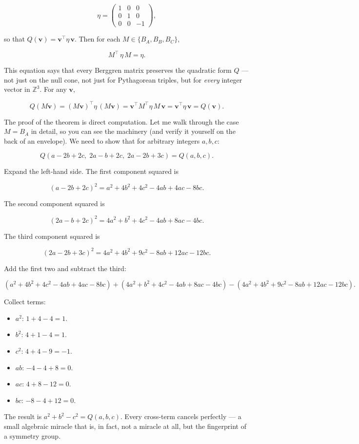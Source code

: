 \[
\eta = \begin{pmatrix} 1 & 0 & 0 \\ 0 & 1 & 0 \\ 0 & 0 & -1 \end{pmatrix},
\]

so that $Q(\mathbf{v}) = \mathbf{v}^\top \eta\, \mathbf{v}$. Then for each $M \in \{B_A, B_B, B_C\}$,

\[
M^{\!\top}\, \eta\, M = \eta.
\]

This equation says that every Berggren matrix preserves the quadratic form $Q$ --- not just on the null cone, not just for Pythagorean triples, but for \textit{every} integer vector in $\mathbb{Z}^3$. For any $\mathbf{v}$,

\[
Q(M\mathbf{v}) = (M\mathbf{v})^\top \eta\, (M\mathbf{v}) = \mathbf{v}^\top M^\top \eta\, M\, \mathbf{v} = \mathbf{v}^\top \eta\, \mathbf{v} = Q(\mathbf{v}).
\]

The proof of the theorem is direct computation. Let me walk through the case $M = B_A$ in detail, so you can see the machinery (and verify it yourself on the back of an envelope). We need to show that for arbitrary integers $a, b, c$:

\[
Q(a - 2b + 2c,\; 2a - b + 2c,\; 2a - 2b + 3c) = Q(a, b, c).
\]

Expand the left-hand side. The first component squared is

\[
(a - 2b + 2c)^2 = a^2 + 4b^2 + 4c^2 - 4ab + 4ac - 8bc.
\]

The second component squared is

\[
(2a - b + 2c)^2 = 4a^2 + b^2 + 4c^2 - 4ab + 8ac - 4bc.
\]

The third component squared is

\[
(2a - 2b + 3c)^2 = 4a^2 + 4b^2 + 9c^2 - 8ab + 12ac - 12bc.
\]

Add the first two and subtract the third:

\[
(a^2 + 4b^2 + 4c^2 - 4ab + 4ac - 8bc) + (4a^2 + b^2 + 4c^2 - 4ab + 8ac - 4bc) - (4a^2 + 4b^2 + 9c^2 - 8ab + 12ac - 12bc).
\]

Collect terms:
\begin{itemize}
\item $a^2$: $1 + 4 - 4 = 1$.
\item $b^2$: $4 + 1 - 4 = 1$.
\item $c^2$: $4 + 4 - 9 = -1$.
\item $ab$: $-4 - 4 + 8 = 0$.
\item $ac$: $4 + 8 - 12 = 0$.
\item $bc$: $-8 - 4 + 12 = 0$.
\end{itemize}
The result is $a^2 + b^2 - c^2 = Q(a, b, c)$. Every cross-term cancels perfectly --- a small algebraic miracle that is, in fact, not a miracle at all, but the fingerprint of a symmetry group.

